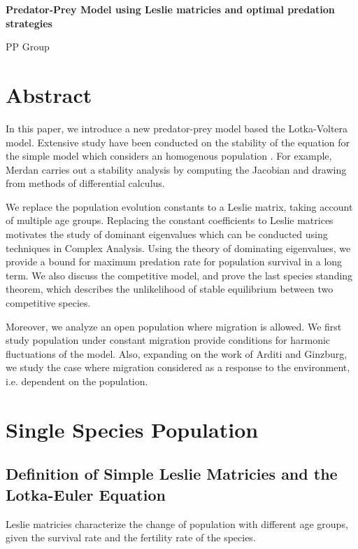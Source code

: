 \documentclass{article}
\numberwithin{equation}{section}
\begin{document}
\begin{center}
    \Large
    \textbf{Predator-Prey Model using Leslie matricies and optimal predation strategies}

    \large
    PP Group
\end{center}

\tableofcontents

\section{Abstract}

In this paper, we introduce a new predator-prey model based 
the Lotka-Voltera model. Extensive study have been conducted 
on the stability of the equation for the simple model which 
considers an homogenous population
. For example, Merdan carries 
out a stability analysis by computing the Jacobian and 
drawing from methods of differential calculus. 

We replace the population evolution constants 
to a Leslie matrix, taking account of multiple age groups. 
Replacing the constant coefficients to 
Leslie matrices motivates the study of dominant eigenvalues 
which can be conducted using techniques in Complex Analysis. 
Using the theory of dominating eigenvalues, we provide a bound 
for maximum predation rate for population survival in a long term. 
We also discuss the competitive model, and prove the 
last species standing theorem, which describes the unlikelihood 
of stable equilibrium between two competitive species. 

Moreover, we analyze an open population where migration 
is allowed. We first study 
population under constant migration provide conditions for harmonic fluctuations 
of the model. Also, expanding on the work of Arditi 
and Ginzburg, we study the case where migration considered 
as a response to the environment, i.e. dependent on the population. 


\section{Single Species Population}

\subsection{Definition of Simple Leslie Matricies and the Lotka-Euler Equation}

Leslie matricies characterize the change of population with 
different age groups, given the survival rate and the fertility rate 
of the species. 
\end{document}
